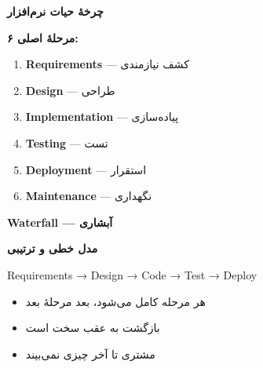 \documentclass[14pt, a4paper, landscape]{extarticle}
\newcommand{\slide}[1]{%
    \newpage
    \begin{center}
    \begin{minipage}[t]{0.95\textwidth}
    \vspace{0.5cm}
    #1
    \vspace{0.5cm}
    \end{minipage}
    \end{center}
}
\newcommand{\slidetitle}[1]{%
    \begin{center}
        {\LARGE\bfseries\textcolor{primary}{#1}}
    \end{center}
    \vspace{0.5cm}
}
\begin{document}
\slide{
    \slidetitle{چرخهٔ حیات نرم‌افزار}
    \vspace{0.5cm}
    \begin{center}
        {\large\bfseries ۶ مرحلهٔ اصلی:}
    \end{center}
    \vspace{0.5cm}
    \begin{enumerate}[itemsep=0.5em]
        \item {\large\textbf{Requirements} — کشف نیازمندی}
        \item {\large\textbf{Design} — طراحی}
        \item {\large\textbf{Implementation} — پیاده‌سازی}
        \item {\large\textbf{Testing} — تست}
        \item {\large\textbf{Deployment} — استقرار}
        \item {\large\textbf{Maintenance} — نگهداری}
    \end{enumerate}
}

\slide{
    \slidetitle{Waterfall — آبشاری}
    \vspace{0.5cm}
    \begin{center}
        {\large\bfseries مدل خطی و ترتیبی}
    \end{center}
    \vspace{0.8cm}
    \begin{center}
        {\large Requirements → Design → Code → Test → Deploy}
    \end{center}
    \vspace{1cm}
    \begin{itemize}[itemsep=0.4em]
        \item هر مرحله کامل می‌شود، بعد مرحلهٔ بعد
        \item بازگشت به عقب سخت است
        \item مشتری تا آخر چیزی نمی‌بیند
    \end{itemize}
}
\end{document}
